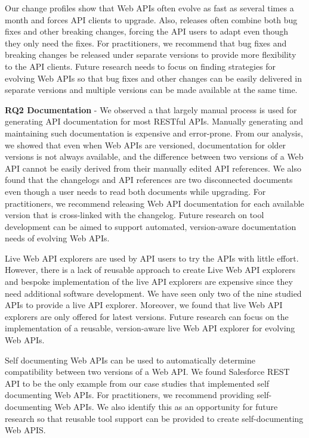 Our change profiles show that Web APIs often evolve as fast as several times a month and forces API clients to upgrade. Also, releases often combine both bug fixes and other breaking changes, forcing the API users to adapt even though they only need the fixes.  For practitioners, we recommend that bug fixes and breaking changes be released under separate versions to provide more flexibility to the API clients. Future research needs to focus on finding strategies for evolving Web APIs so that bug fixes and other changes can be easily delivered in separate versions and multiple versions can be made available at the same time.

\textbf{RQ2 Documentation} - We observed a that largely manual process is used for generating API documentation for most RESTful APIs. Manually generating and maintaining such documentation is expensive and error-prone. From our analysis, we showed that even when Web APIs are  versioned, documentation for older versions is not always available, and the difference between two versions of a Web API cannot be easily derived from their manually edited API references. We also found that the changelogs and API references are two disconnected documents even though a user needs to read both documents while upgrading. For practitioners, we recommend releasing Web API documentation for each available version that is cross-linked with the changelog. Future research on tool development can be aimed to support automated, version-aware documentation needs of evolving Web APIs.

Live Web API explorers are used by API users to try the APIs with little effort. However, there is a lack of reusable approach to create Live Web API explorers and bespoke implementation of the live API explorers are expensive since they need additional software development. We have seen only two of the nine studied APIs to provide a live API explorer. Moreover, we found that live Web API explorers are only offered for latest versions. Future research can focus on the implementation of a reusable, version-aware live Web API explorer for evolving Web APIs.

Self documenting Web APIs can be used to automatically determine compatibility between two versions of a Web API. We found Salesforce REST API to be the only example from our case studies that implemented self documenting Web APIs. For practitioners, we recommend providing self-documenting Web APIs. We also identify this as an opportunity for future research so that reusable tool support can be provided to create self-documenting Web APIS.

